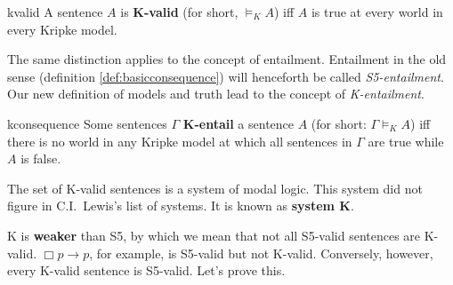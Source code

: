 \begin{definition}{}{kvalid}
  A sentence $A$ is \textbf{K-valid} (for short, $\models_K A$) iff $A$
  is true at every world in every Kripke model.
\end{definition}


The same distinction applies to the concept of entailment. Entailment in the old
sense (definition \ref{def:basicconsequence}) will henceforth be called
\emph{S5-entailment}. Our new definition of models and truth lead to the
concept of \emph{K-entailment}.

\begin{definition}{}{kconsequence}
  Some sentences $\Gamma$ \textbf{K-entail} a sentence $A$ (for short:
  $\Gamma \models_{K} A$) iff there is no world in any Kripke model at which all
  sentences in $\Gamma$ are true while $A$ is false.
\end{definition}

The set of K-valid sentences is a system of modal logic. This system did
not figure in C.I.\ Lewis's list of systems. It is known as \textbf{system K}.

K is \textbf{weaker} than S5, by which we mean that not all S5-valid
sentences are K-valid. $\Box p \to p$, for example, is S5-valid but not K-valid.
Conversely, however, every K-valid sentence is S5-valid. Let's prove this.

